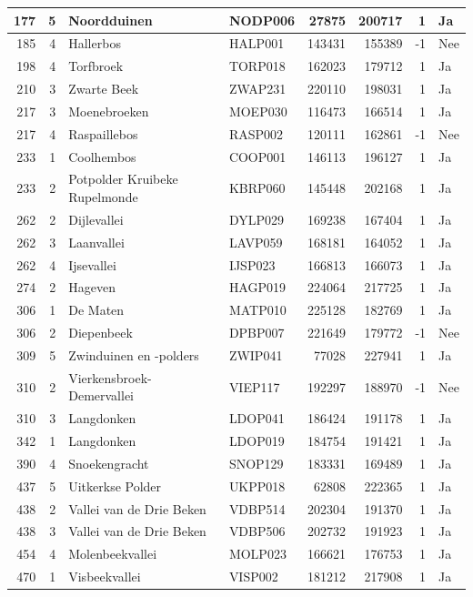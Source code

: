 \documentclass[11pt,]{book}
\begin{document}
\begin{table}
\begin{tabular}[t]{r|r|l|l|r|r|r|l}
\hline
177 & 5 & Noordduinen & NODP006 & 27875 & 200717 & 1 & Ja\\
\hline
185 & 4 & Hallerbos & HALP001 & 143431 & 155389 & -1 & Nee\\
\hline
198 & 4 & Torfbroek & TORP018 & 162023 & 179712 & 1 & Ja\\
\hline
210 & 3 & Zwarte Beek & ZWAP231 & 220110 & 198031 & 1 & Ja\\
\hline
217 & 3 & Moenebroeken & MOEP030 & 116473 & 166514 & 1 & Ja\\
\hline
217 & 4 & Raspaillebos & RASP002 & 120111 & 162861 & -1 & Nee\\
\hline
233 & 1 & Coolhembos & COOP001 & 146113 & 196127 & 1 & Ja\\
\hline
233 & 2 & Potpolder Kruibeke Rupelmonde & KBRP060 & 145448 & 202168 & 1 & Ja\\
\hline
262 & 2 & Dijlevallei & DYLP029 & 169238 & 167404 & 1 & Ja\\
\hline
262 & 3 & Laanvallei & LAVP059 & 168181 & 164052 & 1 & Ja\\
\hline
262 & 4 & Ijsevallei & IJSP023 & 166813 & 166073 & 1 & Ja\\
\hline
274 & 2 & Hageven & HAGP019 & 224064 & 217725 & 1 & Ja\\
\hline
306 & 1 & De Maten & MATP010 & 225128 & 182769 & 1 & Ja\\
\hline
306 & 2 & Diepenbeek & DPBP007 & 221649 & 179772 & -1 & Nee\\
\hline
309 & 5 & Zwinduinen en -polders & ZWIP041 & 77028 & 227941 & 1 & Ja\\
\hline
310 & 2 & Vierkensbroek-Demervallei & VIEP117 & 192297 & 188970 & -1 & Nee\\
\hline
310 & 3 & Langdonken & LDOP041 & 186424 & 191178 & 1 & Ja\\
\hline
342 & 1 & Langdonken & LDOP019 & 184754 & 191421 & 1 & Ja\\
\hline
390 & 4 & Snoekengracht & SNOP129 & 183331 & 169489 & 1 & Ja\\
\hline
437 & 5 & Uitkerkse Polder & UKPP018 & 62808 & 222365 & 1 & Ja\\
\hline
438 & 2 & Vallei van de Drie Beken & VDBP514 & 202304 & 191370 & 1 & Ja\\
\hline
438 & 3 & Vallei van de Drie Beken & VDBP506 & 202732 & 191923 & 1 & Ja\\
\hline
454 & 4 & Molenbeekvallei & MOLP023 & 166621 & 176753 & 1 & Ja\\
\hline
470 & 1 & Visbeekvallei & VISP002 & 181212 & 217908 & 1 & Ja\\

\end{tabular}
\end{table}
\end{document}
